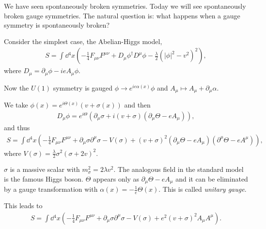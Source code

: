 
We have seen spontaneously broken symmetries. Today we will see spontaneously broken gauge symmetries. The natural question is: what happens when a gauge symmetry is spontaneously broken?

Consider the simplest case, the Abelian-Higgs model,
\begin{align}
    S = \int \dd{^{4}x} \left( -\frac{1}{4}F_{\mu \nu} F^{\mu \nu} + D_\mu \phi^{\dag} D^{\mu} \phi - \frac{\lambda}{2} \left( \left| \phi \right|^2 - v^2 \right)^2 \right) 
,\end{align}
where $D_\mu = \partial_\mu \phi - i e A_\mu \phi$.

Now the $U\left( 1 \right) $ symmetry is gauged $\phi \to e^{ie \alpha \left( x \right) } \phi$ and $A_\mu \mapsto A_\mu + \partial_\mu \alpha$.

We take $\phi \left( x \right) = e^{i \Theta\left( x \right) } \left( v + \sigma \left( x \right)  \right)$ and then
\begin{align}
    D_\mu \phi = e^{i \Theta} \left( \partial_\mu \sigma + i \left( v + \sigma \right) \left( \partial_\mu \Theta - e A_\mu \right)  \right) 
,\end{align}
and thus
\begin{align}
    S = \int \dd{^{4}x} \left( -\frac{1}{4} F_{\mu \nu} F^{\mu \nu} + \partial_\mu \sigma \partial^{\mu} \sigma - V \left( \sigma \right)  + \left( v + \sigma \right)^2 \left( \partial_\mu \Theta - e A_\mu \right) \left( \partial^{\mu} \Theta - e A^{\mu} \right)  \right) 
,\end{align}
where $V \left( \sigma \right) = \frac{\lambda}{2}\sigma^2 \left( \sigma + 2 v \right)^2$.

\begin{note}
    $\sigma$ is a massive scalar with $m_\sigma^2 = 2 \lambda v^2$. The analogous field in the standard model is the famous Higgs boson. $\Theta$ appears only as $\partial_\mu \Theta - e A_\mu$ and it can be eliminated by a gauge transformation with $\alpha \left( x \right) = - \frac{1}{e}\Theta \left( x \right) $. This is called \emph{unitary gauge}.
\end{note}

This leads to
\begin{align}
    S = \int \dd{^{4}x} \left( -\frac{1}{4} F_{\mu \nu} F^{\mu \nu} + \partial_\mu \sigma \partial^{\mu} \sigma - V\left( \sigma \right)  + e^2 \left( v + \sigma \right)^2 A_\mu A^{\mu} \right) 
.\end{align}

